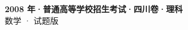 \documentclass[zihao=-4, a4paper]{ctexart}
\begin{document}
\begin{center}
  {\Large\bfseries 2008 年·普通高等学校招生考试·四川卷·理科}\\[4pt]
  {\large 数学 · 试题版}
\end{center}
\medskip
{}

\end{document}
